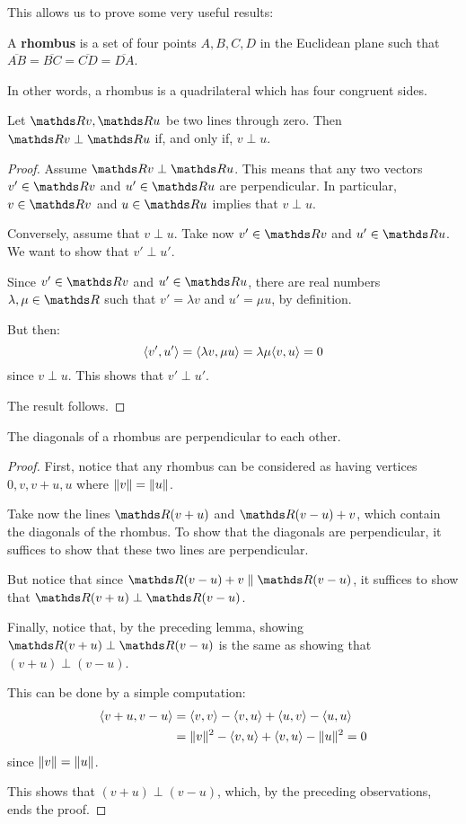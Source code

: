This allows us to prove some very useful results:

\begin{df}
	A \textbf{rhombus} is a set of four points $A,B,C,D$ in the Euclidean plane such that $\overline{AB}=\overline{BC}=\overline{CD}=\overline{DA}$.
	
	In other words, a rhombus is a quadrilateral which has four congruent sides.
\end{df}

\begin{lemma}
	Let $\R v,\R u$ be two lines through zero. Then $\R v\perp \R u$ if, and only if, $v\perp u$.
\end{lemma}
\begin{proof}
	Assume $\R v\perp \R u$. This means that any two vectors $v'\in \R v$ and $u'\in \R u$ are perpendicular. In particular, $v\in \R v$ and $u\in \R u$ implies that $v\perp u$.
	
	\bigskip
	Conversely, assume that $v\perp u$. Take now $v'\in \R v$ and $u'\in \R u$. We want to show that $v'\perp u'$.
	
	Since $v'\in \R v$ and $u'\in \R u$, there are real numbers $\lambda,\mu\in \R$ such that $v'=\lambda v$ and $u'=\mu u$, by definition.
	
	But then:
	\[\langle v',u'\rangle=\langle \lambda v,\mu u\rangle=\lambda\mu\langle v,u\rangle=0\] since $v\perp u$. This shows that $v'\perp u'$.
	
	The result follows.
\end{proof}
\begin{cor}
	The diagonals of a rhombus are perpendicular to each other.
\end{cor}
\begin{proof}
	First, notice that any rhombus can be considered as having vertices $0,v,v+u,u$ where $\lVert v\rVert=\lVert u\rVert$.
	
	Take now the lines $\R(v+u)$ and $\R(v-u)+v$, which contain the diagonals of the rhombus. To show that the diagonals are perpendicular, it suffices to show that these two lines are perpendicular.
	
	But notice that since $\R(v-u)+v\parallel\R(v-u)$, it suffices to show that $\R(v+u)\perp\R(v-u)$.
	
	Finally, notice that, by the preceding lemma, showing $\R(v+u)\perp\R(v-u)$ is the same as showing that $(v+u)\perp (v-u)$.
	
	This can be done by a simple computation:
	\begin{align*}
		\langle v+u,v-u\rangle&=\langle v,v\rangle-\langle v,u\rangle+\langle u,v\rangle-\langle u,u\rangle\\
		&=\lVert v\rVert^2-\langle v,u\rangle+\langle v,u\rangle-\lVert u\rVert^2=0
	\end{align*}since $\lVert v\rVert=\lVert u\rVert$.
	
	This shows that $(v+u)\perp(v-u)$, which, by the preceding observations, ends the proof.
\end{proof}

